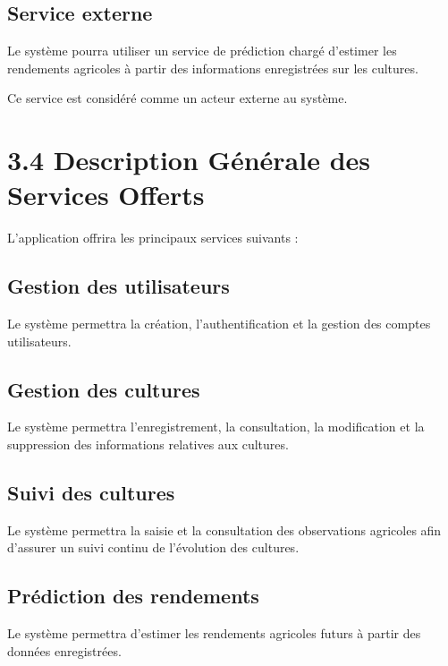 \documentclass[12pt,a4paper]{report}
\begin{document}
\subsection{Service externe}\label{service-externe}

Le système pourra utiliser un service de prédiction chargé d'estimer les
rendements agricoles à partir des informations enregistrées sur les
cultures.

Ce service est considéré comme un acteur externe au système.

\section{3.4 Description Générale des Services
Offerts}\label{description-guxe9nuxe9rale-des-services-offerts}

L'application offrira les principaux services suivants :

\subsection{Gestion des utilisateurs}\label{gestion-des-utilisateurs-1}

Le système permettra la création, l'authentification et la gestion des
comptes utilisateurs.

\subsection{Gestion des cultures}\label{gestion-des-cultures}

Le système permettra l'enregistrement, la consultation, la modification
et la suppression des informations relatives aux cultures.

\subsection{Suivi des cultures}\label{suivi-des-cultures-1}

Le système permettra la saisie et la consultation des observations
agricoles afin d'assurer un suivi continu de l'évolution des cultures.

\subsection{Prédiction des
rendements}\label{pruxe9diction-des-rendements-1}

Le système permettra d'estimer les rendements agricoles futurs à partir
des données enregistrées.
\end{document}
